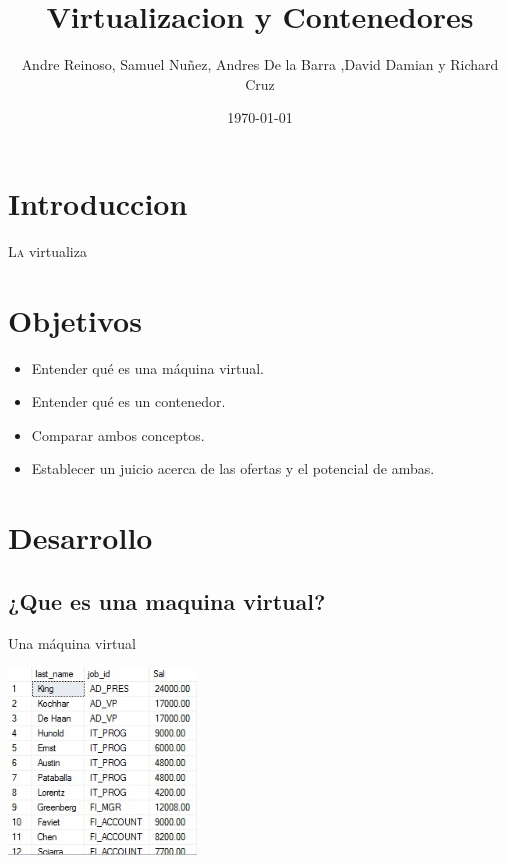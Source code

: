 \documentclass[twoside,twocolumn]{article}
\title{Virtualizacion y Contenedores} %
\author{Andre Reinoso, Samuel Nuñez, Andres De la Barra ,David Damian y Richard Cruz}
\date{\today} %
\begin{document}
\maketitle


\section{Introduccion}

\lettrine[nindent=0em,lines=3]{L}a virtualiza




\section{Objetivos}

\begin{itemize}
\item Entender qué es una máquina virtual.
\item Entender qué es un contenedor.
\item Comparar ambos conceptos.
\item Establecer un juicio acerca de las ofertas y el potencial de ambas.

\end{itemize}





\section{Desarrollo}

\subsection{¿Que es una maquina virtual?}

Una máquina virtual 

\begin{center}
	\includegraphics[width=5cm]{./Imagenes/virtualizacion} 
	\end{center}
\end{document}

